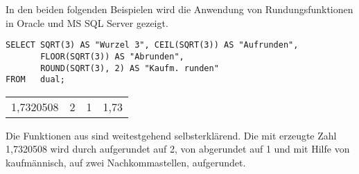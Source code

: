 In den beiden folgenden Beispielen wird die Anwendung von
Rundungsfunktionen in Oracle und MS SQL Server gezeigt.
\begin{lstlisting}[language=oracle_sql,caption={Rundungsfunktionen in Oracle},label=sql03_15]
SELECT SQRT(3) AS "Wurzel 3", CEIL(SQRT(3)) AS "Aufrunden",
       FLOOR(SQRT(3)) AS "Abrunden",
       ROUND(SQRT(3), 2) AS "Kaufm. runden"
FROM   dual;
        \end{lstlisting}
\begin{center}
    \begin{small}
        \tablehead{}
        \begin{oraclesql}
            \begin{supertabular}{rrrr}
                1,7320508 & 2 & 1 & 1,73 \\
            \end{supertabular}
        \end{oraclesql}
    \end{small}
\end{center}
Die Funktionen aus  sind weitestgehend
selbsterklärend. Die mit  erzeugte Zahl
1,7320508 wird durch  aufgerundet auf 2, von
 abgerundet auf 1 und mit Hilfe von
 kaufmännisch, auf zwei Nachkommastellen,
aufgerundet.


